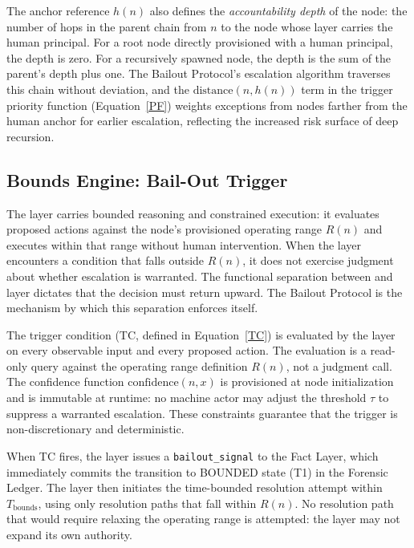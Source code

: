 The anchor reference $h(n)$ also defines the \emph{accountability depth} of the node: the number of hops in the parent chain from $n$ to the node whose \purpose{} layer carries the human principal. For a root node directly provisioned with a human principal, the depth is zero. For a recursively spawned node, the depth is the sum of the parent's depth plus one. The Bailout Protocol's escalation algorithm traverses this chain without deviation, and the $\text{distance}(n, h(n))$ term in the trigger priority function (Equation~\ref{PF}) weights exceptions from nodes farther from the human anchor for earlier escalation, reflecting the increased risk surface of deep recursion.

\subsection{Bounds Engine: Bail-Out Trigger}
\label{sec:impl:bounds}

The \bounds{} layer carries bounded reasoning and constrained execution: it evaluates proposed actions against the node's provisioned operating range $R(n)$ and executes within that range without human intervention. When the \bounds{} layer encounters a condition that falls outside $R(n)$, it does not exercise judgment about whether escalation is warranted. The functional separation between \bounds{} and \purpose{} layer dictates that the decision must return upward. The Bailout Protocol is the mechanism by which this separation enforces itself.

The trigger condition (TC, defined in Equation~\ref{TC}) is evaluated by the \bounds{} layer on every observable input and every proposed action. The evaluation is a read-only query against the operating range definition $R(n)$, not a judgment call. The confidence function $\text{confidence}(n, x)$ is provisioned at node initialization and is immutable at runtime: no machine actor may adjust the threshold $\tau$ to suppress a warranted escalation. These constraints guarantee that the trigger is non-discretionary and deterministic.

When TC fires, the \bounds{} layer issues a \texttt{bailout\_signal} to the Fact Layer, which immediately commits the transition to BOUNDED state (T1) in the Forensic Ledger. The \bounds{} layer then initiates the time-bounded resolution attempt within $T_{\text{bounds}}$, using only resolution paths that fall within $R(n)$. No resolution path that would require relaxing the operating range is attempted: the \bounds{} layer may not expand its own authority.

